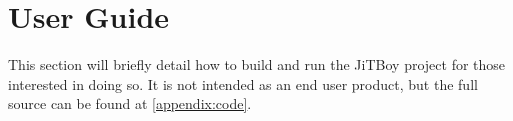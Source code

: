 \section{User Guide}
\label{section:user-guide}

This section will briefly detail how to build and run the JiTBoy project for those interested in doing so. It is not intended as an end user product, but the full source can be found at \autoref{appendix:code}.


